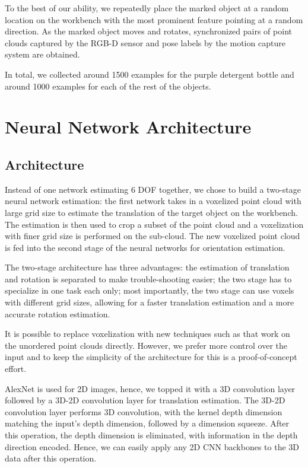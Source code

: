 \documentclass[conference]{IEEEtran}
\begin{document}
To the best of our ability, we repeatedly place the marked object at a random location on the workbench with the most prominent feature pointing at a random direction. As the marked object moves and rotates, synchronized pairs of point clouds captured by the RGB-D sensor and pose labels by the motion capture system are obtained.

In total, we collected around 1500 examples for the purple detergent bottle and around 1000 examples for each of the rest of the objects.


\section{Neural Network Architecture}
\subsection{Architecture}
Instead of one network estimating 6 DOF together, we chose to build a two-stage neural network estimation: the first network takes in a voxelized point cloud with large grid size to estimate the translation of the target object on the workbench. The estimation is then used to crop a subset of the point cloud and a voxelization with finer grid size is performed on the sub-cloud. The new voxelized point cloud is fed into the second stage of the neural networks for orientation estimation. 

The two-stage architecture has three advantages: the estimation of translation and rotation is separated to make trouble-shooting easier; the two stage has to specialize in one task each only; most importantly, the two stage can use voxels with different grid sizes, allowing for a faster translation estimation and a more accurate rotation estimation.

It is possible to replace voxelization with new techniques such as \cite{qi_2018_cvpr} that work on the unordered point clouds directly. However, we prefer more control over the input and to keep the simplicity of the architecture for this is a proof-of-concept effort.

AlexNet is used for 2D images, hence, we topped it with a 3D convolution layer followed by a 3D-2D convolution layer for translation estimation. The 3D-2D convolution layer performs 3D convolution, with the kernel depth dimension matching the input's depth dimension, followed by a dimension squeeze. After this operation, the depth dimension is eliminated, with information in the depth direction encoded. Hence, we can easily apply any 2D CNN backbones to the 3D data after this operation.
\end{document}
